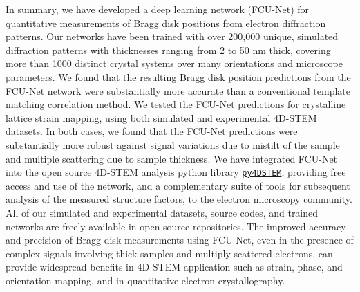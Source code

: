 \documentclass[%
 reprint,
superscriptaddress,
 amsmath,
 amssymb,
 prl,
]{revtex4-2}
\newcommand{\pyFDSTEM}{\href{https://github.com/py4dstem/py4DSTEM}{\texttt{py4DSTEM}}}
\begin{document}




In summary, we have developed a deep learning network  (FCU-Net) for quantitative measurements of Bragg disk positions from electron diffraction patterns. Our networks have been trained with over 200,000 unique, simulated diffraction patterns with thicknesses ranging from 2 to 50 nm thick, covering more than 1000 distinct crystal systems over many orientations and microscope parameters. We found that the resulting Bragg disk position predictions from the FCU-Net network were substantially more accurate than a conventional template matching correlation method. We tested the FCU-Net predictions for crystalline lattice strain mapping, using both simulated and experimental 4D-STEM datasets. In both cases, we found that the FCU-Net predictions were substantially more robust against signal variations due to mistilt of the sample and multiple scattering due to sample thickness. We have integrated FCU-Net into the open source 4D-STEM analysis python library \pyFDSTEM{}, providing free access and use of the network, and a complementary suite of tools for subsequent analysis of the measured structure factors, to the electron microscopy community. All of our simulated and experimental datasets, source codes, and trained networks are freely available in open source repositories. The improved accuracy and precision of Bragg disk measurements using FCU-Net, even in the presence of complex signals involving thick samples and multiply scattered electrons, can provide widespread benefits in 4D-STEM application such as strain, phase, and orientation mapping, and in quantitative electron crystallography.

\end{document}
